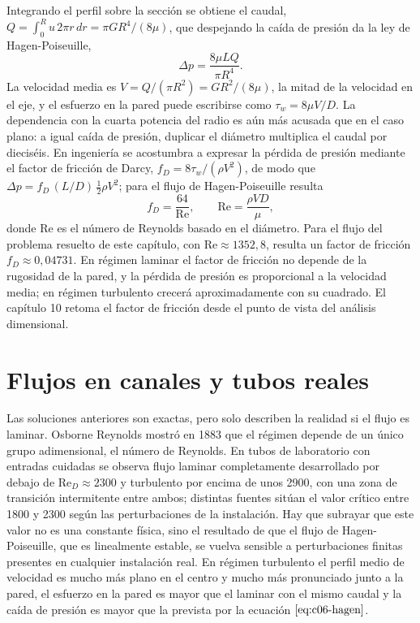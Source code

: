 \documentclass[10pt,openany]{book}
\begin{document}
Integrando el perfil sobre la sección se obtiene el caudal, \(Q = \int_0^{R} u\,2\pi r\,dr = \pi G R^{4}/(8\mu)\), que despejando la caída de presión da la ley de Hagen-Poiseuille,
\begin{equation}
\Delta p = \frac{8\mu L Q}{\pi R^{4}}. \label{eq:c06-hagen}
\end{equation}
La velocidad media es \(V = Q/(\pi R^{2}) = G R^{2}/(8\mu)\), la mitad de la velocidad en el eje, y el esfuerzo en la pared puede escribirse como \(\tau_w = 8\mu V/D\). La dependencia con la cuarta potencia del radio es aún más acusada que en el caso plano: a igual caída de presión, duplicar el diámetro multiplica el caudal por dieciséis. En ingeniería se acostumbra a expresar la pérdida de presión mediante el factor de fricción de Darcy, \(f_D = 8\tau_w/(\rho V^{2})\), de modo que \(\Delta p = f_D\,(L/D)\,\tfrac12\rho V^{2}\); para el flujo de Hagen-Poiseuille resulta
\begin{equation}
f_D = \frac{64}{\mathrm{Re}}, \qquad \mathrm{Re} = \frac{\rho V D}{\mu}, \label{eq:c06-factor}
\end{equation}
donde \(\mathrm{Re}\) es el número de Reynolds basado en el diámetro. Para el flujo del problema resuelto de este capítulo, con \(\mathrm{Re} \approx 1352{,}8\), resulta un factor de fricción \(f_D \approx 0{,}04731\). En régimen laminar el factor de fricción no depende de la rugosidad de la pared, y la pérdida de presión es proporcional a la velocidad media; en régimen turbulento crecerá aproximadamente con su cuadrado. El capítulo 10 retoma el factor de fricción desde el punto de vista del análisis dimensional.

\section{Flujos en canales y tubos reales}

Las soluciones anteriores son exactas, pero solo describen la realidad si el flujo es laminar. Osborne Reynolds mostró en 1883 que el régimen depende de un único grupo adimensional, el número de Reynolds. En tubos de laboratorio con entradas cuidadas se observa flujo laminar completamente desarrollado por debajo de \(\mathrm{Re}_D \approx 2300\) y turbulento por encima de unos 2900, con una zona de transición intermitente entre ambos; distintas fuentes sitúan el valor crítico entre 1800 y 2300 según las perturbaciones de la instalación. Hay que subrayar que este valor no es una constante física, sino el resultado de que el flujo de Hagen-Poiseuille, que es linealmente estable, se vuelva sensible a perturbaciones finitas presentes en cualquier instalación real. En régimen turbulento el perfil medio de velocidad es mucho más plano en el centro y mucho más pronunciado junto a la pared, el esfuerzo en la pared es mayor que el laminar con el mismo caudal y la caída de presión es mayor que la prevista por la ecuación \(\eqref{eq:c06-hagen}\).
\end{document}
